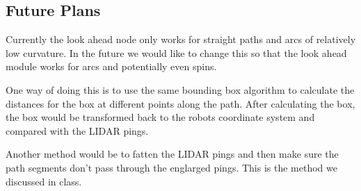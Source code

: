 \subsection{Future Plans}
Currently the look ahead node only works for straight paths and arcs
of relatively low curvature.  In the future we would like to change
this so that the look ahead module works for arcs and potentially even
spins.

One way of doing this is to use the same bounding box algorithm to
calculate the distances for the box at different points along the
path.  After calculating the box, the box would be transformed back to
the robots coordinate system and compared with the LIDAR pings.

Another method would be to fatten the LIDAR pings and then make sure
the path segments don't pass through the englarged pings.  This is the
method we discussed in class.




